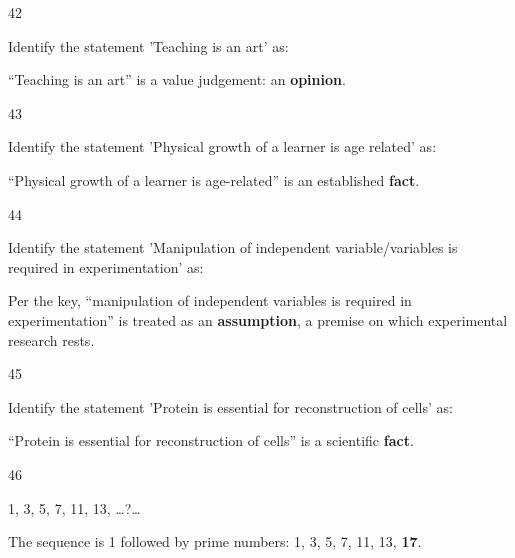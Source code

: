 \begin{question}{42}
{Identify the statement 'Teaching is an art' as:\par}
\begin{explain}
``Teaching is an art'' is a value judgement: an \textbf{opinion}.
\end{explain}
\end{question}

\begin{question}{43}
{Identify the statement 'Physical growth of a learner is age related' as:\par}
\begin{explain}
``Physical growth of a learner is age-related'' is an established \textbf{fact}.
\end{explain}
\end{question}

\begin{question}{44}
{Identify the statement 'Manipulation of independent variable/variables is required in experimentation' as:\par}
\begin{explain}
Per the key, ``manipulation of independent variables is required in experimentation'' is treated as an \textbf{assumption}, a premise on which experimental research rests.
\end{explain}
\end{question}

\begin{question}{45}
{Identify the statement 'Protein is essential for reconstruction of cells' as:\par}
\begin{explain}
``Protein is essential for reconstruction of cells'' is a scientific \textbf{fact}.
\end{explain}
\end{question}

\begin{question}{46}
{1, 3, 5, 7, 11, 13, \ldots{}?\ldots{}\par}
\begin{explain}
The sequence is 1 followed by prime numbers: 1, 3, 5, 7, 11, 13, \textbf{17}.
\end{explain}
\end{question}

